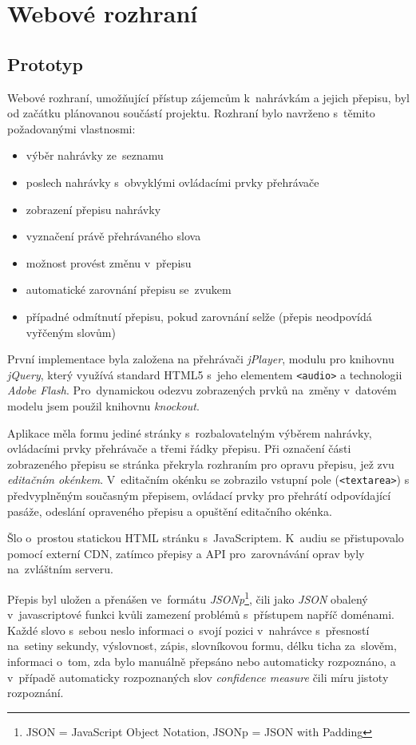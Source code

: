 \chapter{Webové rozhraní}
\label{kap:webove-rozhrani}

\section{Prototyp}

Webové rozhraní, umožňující přístup zájemcům k~nahrávkám a jejich přepisu, byl
od začátku plánovanou součástí projektu. Rozhraní bylo navrženo s~těmito
požadovanými vlastnosmi:

\begin{itemize}
\item{výběr nahrávky ze~seznamu}
\item{poslech nahrávky s~obvyklými ovládacími prvky přehrávače}
\item{zobrazení přepisu nahrávky}
\item{vyznačení právě přehrávaného slova}
\item{možnost provést změnu v~přepisu}
\item{automatické zarovnání přepisu se~zvukem}
\item{případné odmítnutí přepisu, pokud zarovnání selže (přepis neodpovídá
vyřčeným slovům)}
\end{itemize}

První implementace byla založena na přehrávači \textit{jPlayer}, modulu pro
knihovnu \textit{jQuery}, který využívá standard HTML5 s~jeho elementem
\texttt{<audio>} a technologii \textit{Adobe Flash}. Pro~dynamickou odezvu
zobrazených prvků na~změny v~datovém modelu jsem použil knihovnu
\textit{knockout}.

Aplikace měla formu jediné stránky s~rozbalovatelným výběrem nahrávky,
ovládacími prvky přehrávače a třemi řádky přepisu. Při označení části
zobrazeného přepisu se stránka překryla rozhraním pro opravu přepisu, jež zvu
\textit{editačním okénkem}. V~editačním okénku se zobrazilo vstupní pole
(\texttt{<textarea>}) s předvyplněným současným přepisem, ovládací prvky pro
přehrátí odpovídající pasáže, odeslání opraveného přepisu a opuštění editačního
okénka.

Šlo o~prostou statickou HTML stránku s~JavaScriptem. K~audiu se přistupovalo
pomocí externí CDN, zatímco přepisy a API pro~zarovnávání oprav byly
na~zvláštním serveru.

Přepis byl uložen a přenášen ve~formátu \textit{JSONp}\footnote{JSON =
JavaScript Object Notation, JSONp = JSON with Padding}, čili jako \textit{JSON}
obalený v~javascriptové funkci kvůli zamezení problémů s~přístupem napříč
doménami.  Každé slovo s~sebou neslo informaci o~svojí pozici v~nahrávce
s~přesností na~setiny sekundy, výslovnost, zápis, slovníkovou formu, délku ticha
za~slověm, informaci o~tom, zda bylo manuálně přepsáno nebo automaticky
rozpoznáno, a v~případě automaticky rozpoznaných slov \textit{confidence
measure} čili míru jistoty rozpoznání.

